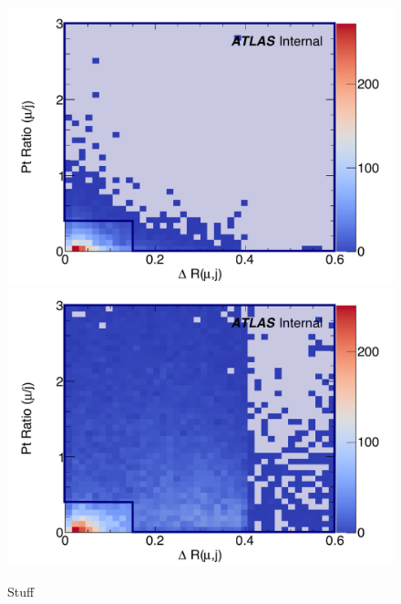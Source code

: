 \begin{figure}[htbp]
  \centering
  \includegraphics[width=.48\textwidth]{figs/ssww_13tev/custom_or/sig_Muon_DR_PtRatio_edited}
  \includegraphics[width=.48\textwidth]{figs/ssww_13tev/custom_or/bkg_Muon_DR_PtRatio_edited}
  \caption{Stuff}
  \label{fig:ssww13tev_customor_muon_2d}
\end{figure}

